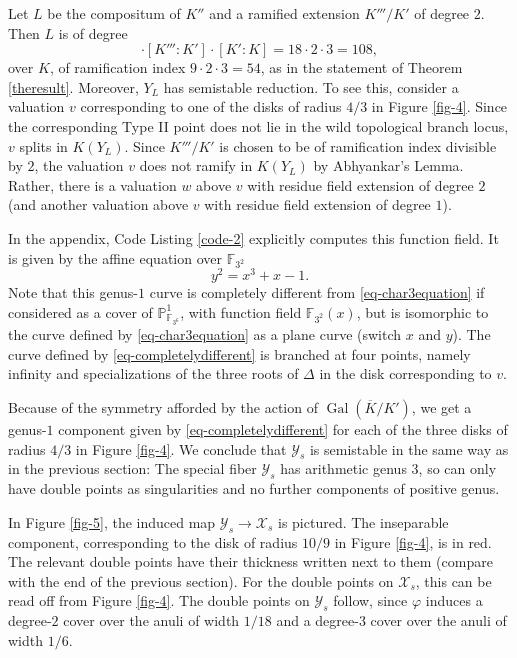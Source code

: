 \documentclass[11pt]{amsart}
\DeclareMathOperator{\Gal}{Gal}
\renewcommand{\phi}{\varphi}
\newcommand{\BF}{{\mathbb{F}}}
\newcommand{\BP}{{\mathbb{P}}}
\newcommand{\CX}{{\mathcal X}}
\newcommand{\CY}{{\mathcal Y}}
\theoremstyle{definition}
\begin{document}
Let $L$ be the compositum of $K''$ and a ramified extension $K'''/K'$ of degree $2$. Then $L$ is of degree 
\begin{equation*}
[K'':K']\cdot[K''':K']\cdot[K':K]=18\cdot2\cdot3=108,
\end{equation*}
over $K$, of ramification index $9\cdot2\cdot3=54$, as in the statement of Theorem \ref{theresult}. Moreover, $Y_L$ has semistable reduction. To see this, consider a valuation $v$ corresponding to one of the disks of radius $4/3$ in Figure \ref{fig-4}. Since the corresponding Type II point does not lie in the wild topological branch locus, $v$ splits in $K(Y_L)$. Since $K'''/K'$ is chosen to be of ramification index divisible by $2$, the valuation $v$ does not ramify in $K(Y_L)$ by Abhyankar's Lemma. Rather, there is a valuation $w$ above $v$ with residue field extension of degree $2$ (and another valuation above $v$ with residue field extension of degree $1$).

In the appendix, Code Listing \ref{code-2} explicitly computes this function field. It is given by the affine equation over $\BF_{3^2}$
\begin{equation}\label{eq-completelydifferent}
y^2=x^3+x-1.
\end{equation}
Note that this genus-$1$ curve is completely different from \eqref{eq-char3equation} if considered as a cover of $\BP^1_{\BF_{3^6}}$, with function field $\BF_{3^2}(x)$, but is isomorphic to the curve defined by \eqref{eq-char3equation} as a plane curve (switch $x$ and $y$). The curve defined by \eqref{eq-completelydifferent} is branched at four points, namely infinity and specializations of the three roots of $\Delta$ in the disk corresponding to $v$.

Because of the symmetry afforded by the action of $\Gal(\overline{K}/K')$, we get a genus-$1$ component given by \eqref{eq-completelydifferent} for each of the three disks of radius $4/3$ in Figure \ref{fig-4}. We conclude that $\CY_s$ is semistable in the same way as in the previous section: The special fiber $\CY_s$ has arithmetic genus $3$, so can only have double points as singularities and no further components of positive genus.

In Figure \ref{fig-5}, the induced map $\CY_s\to\CX_s$ is pictured. The inseparable component, corresponding to the disk of radius $10/9$ in Figure \ref{fig-4}, is in red. The relevant double points have their thickness written next to them (compare with the end of the previous section). For the double points on $\CX_s$, this can be read off from Figure \ref{fig-4}. The double points on $\CY_s$ follow, since $\phi$ induces a degree-$2$ cover over the anuli of width $1/18$ and a degree-$3$ cover over the anuli of width $1/6$.
\end{document}
